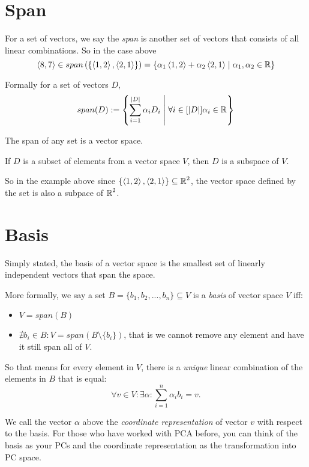 \section{Span}
For a set of vectors, we say the \emph{span} is another set of vectors that consists of all linear combinations. 
So in the case above
\[
\langle8,7\rangle \in span\left(\left\{\left\langle1,2\right\rangle,\left\langle2,1\right\rangle\right\}\right) = 
\left\{\alpha_1\left\langle1,2\right\rangle + \alpha_2\left\langle2,1\right\rangle \;\middle|\; \alpha_1,\alpha_2 \in \operatorname{\mathbb{R}}\right\}
\]

Formally for a set of vectors $D$, 
\[
span(D) := \left\{\sum_{i=1}^{|D|} \alpha_iD_i \;\middle|\; \forall i \in [|D|]\alpha_i \in \operatorname{\mathbb{R}} \right\}
\]

The span of any set is a vector space. 

If $D$ is a subset of elements from a vector space $V$, then $D$ is a subspace of $V$. 

So in the example above since $\left\{\left\langle1,2\right\rangle,\left\langle2,1\right\rangle\right\}\subseteq\operatorname{\mathbb{R}}^2$,
the vector space defined by the set is also a subpace of $\operatorname{\mathbb{R}}^2$.

\section{Basis}
Simply stated, the basis of a vector space is the smallest set of linearly independent vectors that span the space. 

More formally, we say a set $B=\{b_1,b_2,...,b_n\} \subseteq V$ is a \emph{basis} of vector space $V$ iff:
\begin{itemize}
\item $V = span(B)$
\item $\nexists b_i\in B : V = span(B\setminus\{b_i\})$, that is we cannot remove any element and have it still span all of $V$.
\end{itemize}

So that means for every element in $V$, there is a \textit{unique} linear combination of the elements in $B$ that is equal:
\[\forall v \in V : \exists \alpha : \sum_{i=1}^n \alpha_ib_i = v.\]

We call the vector $\alpha$ above the \emph{coordinate representation} of vector $v$ with respect to the basis. 
For those who have worked with PCA before, you can think of the basis as your PCs and the coordinate representation as the transformation into PC space. 


